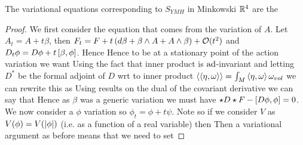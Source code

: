 \documentclass{article}
\begin{document}
\begin{prop}
	The variational equations corresponding to $S_{YMH}$ in Minkowski $\mathbb{R}^4$ are the
\end{prop}
\begin{proof}
	We first consider the equation that comes from the variation of $A$. Let $A_t = A + t\beta$, then $F_t = F + t\left( d\beta + \beta \wedge A + A \wedge \beta \right) + \mathcal{O}(t^2)$ and $D_t \phi = D \phi + t\left[ \beta, \phi \right]$. Hence 
Hence to be at a stationary point of the action variation we want
Using the fact that inner product is $\operatorname{ad}$-invariant and letting $D^\ast$ be the formal adjoint of $D$ wrt to inner product $\left\langle \left\langle \eta,\omega \right\rangle \right\rangle = \int_M \left\langle \eta,\omega \right\rangle \omega_{vol}$ we can rewrite this as 
Using results on the dual of the covariant derivative we can say that 
Hence as $\beta$ was a generic variation we must have $\star D \star F - \left[ D\phi, \phi \right] =0$. \\
We now consider a $\phi$ variation so $\phi_t = \phi + t\psi$. Note 
so if we consider $V$ as $V(\phi)=V(\left\lvert \phi \right\rvert)$ (i.e. as a function of a real variable) then 
Then a variational argument as before means that we need to set 
\end{proof}
\end{document}
